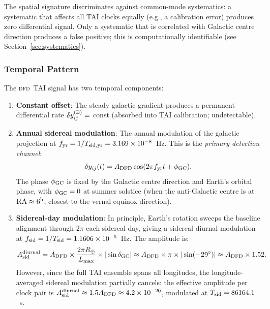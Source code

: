 \documentclass[aps,prd,twocolumn,superscriptaddress,nofootinbib]{revtex4-2}
\newcommand{\DFD}{\textsc{dfd}}
\begin{document}
The spatial signature discriminates against common-mode systematics: a
systematic that affects all TAI clocks equally (e.g., a calibration error)
produces zero differential signal. Only a systematic that is correlated with
Galactic centre direction produces a false positive; this is computationally
identifiable (see Section~\ref{sec:systematics}).

\subsubsection{Temporal Pattern}

The \DFD\ TAI signal has two temporal components:
\begin{enumerate}
\item \textbf{Constant offset}: The steady galactic gradient produces a
      permanent differential rate $\delta y_{ij}^{(\rm B)} = $ const (absorbed
      into TAI calibration; undetectable).

\item \textbf{Annual sidereal modulation}: The annual modulation of the
      galactic projection at $f_{\rm yr} = 1/T_{\rm sid,yr} = 3.169\times10^{-8}$~Hz.
      This is the \emph{primary detection channel}:
      \begin{equation}
      \delta y_{ij}(t) = A_{\rm DFD}\cos(2\pi f_{\rm yr} t + \phi_{\rm GC}).
      \label{eq:temporal}
      \end{equation}
      The phase $\phi_{\rm GC}$ is fixed by the Galactic centre direction and
      Earth's orbital phase, with $\phi_{\rm GC} = 0$ at summer solstice
      (when the anti-Galactic centre is at $\text{RA} \approx 6^{\rm h}$,
      closest to the vernal equinox direction).

\item \textbf{Sidereal-day modulation}: In principle, Earth's rotation sweeps
      the baseline alignment through $2\pi$ each sidereal day, giving a
      sidereal diurnal modulation at $f_{\rm sid} = 1/T_{\rm sid} = 1.1606\times10^{-5}$~Hz.
      The amplitude is:
      \begin{equation}
      A_{\rm sid}^{\rm diurnal} = A_{\rm DFD}\times\frac{2\pi R_\oplus}{L_{\rm max}}
        \times |\sin\delta_{\rm GC}|
      \approx A_{\rm DFD}\times\pi\times|\sin(-29^\circ)|
      \approx A_{\rm DFD}\times 1.52.
      \end{equation}
      However, since the full TAI ensemble spans all longitudes, the
      longitude-averaged sidereal modulation partially cancels:
      the effective amplitude per clock pair is
      $A_{\rm sid}^{\rm diurnal} \approx 1.5 A_{\rm DFD} \approx 4.2\times10^{-20}$,
      modulated at $T_{\rm sid} = 86164.1$~s.
\end{enumerate}
\end{document}
